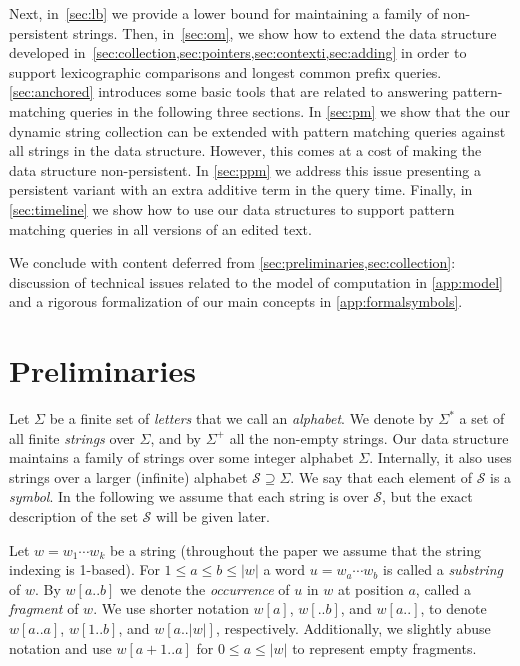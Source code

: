 \documentclass[a4paper]{article}
\theoremstyle{remark}
\newcommand{\symbols}{\mathcal{S}}
\newcommand{\str}{w}
\begin{document}
Next, in~\cref{sec:lb} we provide a lower bound for maintaining a family of non-persistent strings.
Then, in~\cref{sec:om}, we show how to extend the data structure developed in~\cref{sec:collection,sec:pointers,sec:contexti,sec:adding} in order to support lexicographic comparisons and longest common prefix queries.
\cref{sec:anchored} introduces some basic tools that are related to answering pattern-matching queries in the following three sections.
In \cref{sec:pm} we show that the our dynamic string collection can be extended with pattern matching queries against all strings in the data structure.
However, this comes at a cost of making the data structure non-persistent.
In \cref{sec:ppm} we address this issue presenting a persistent variant with an extra additive term in the query time.
Finally, in \cref{sec:timeline} we show how to use our data structures to support pattern matching queries in all versions of an edited text.

We conclude with content deferred from \cref{sec:preliminaries,sec:collection}: 
discussion of technical issues related to the model of computation in \cref{app:model} and a rigorous formalization of our main concepts in \cref{app:formalsymbols}.
\section{Preliminaries}\label{sec:preliminaries}
Let $\Sigma$ be a finite set of \emph{letters} that we call an \emph{alphabet}.
We denote by $\Sigma^{*}$ a set of all finite \emph{strings} over $\Sigma$,
and by $\Sigma^+$ all the non-empty strings.
Our data structure maintains a family of strings over some integer alphabet $\Sigma$.
Internally, it also uses strings over a larger (infinite) alphabet $\symbols \supseteq \Sigma$.
We say that each element of $\symbols$ is a \emph{symbol}.
In the following we assume that each string is over $\symbols$, but the exact description of the set $\symbols$ will be given later.

Let $\str = \str_1 \cdots \str_k$ be a string (throughout the paper we assume that the string indexing is 1-based).
For $1\le a \le b \le |\str|$ a word $u=\str_a \cdots \str_b$ is called a \emph{substring} of $\str$.
By $\str[a..b]$ we denote the \emph{occurrence} of $u$ in $\str$ at position $a$, called a \emph{fragment} of $\str$.
We use shorter notation $\str[a]$, $\str[..b]$, and $\str[a..]$, to denote $\str[a..a]$, $\str[1..b]$, and $\str[a..|\str|]$, respectively.
Additionally, we slightly abuse notation and use $\str[a+1..a]$ for $0 \le a \le |\str|$ to represent empty fragments. 
\end{document}
